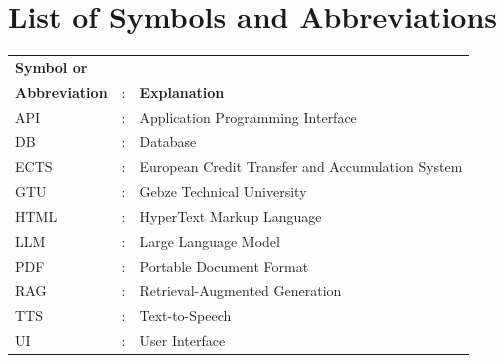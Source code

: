 \chapter*{List of Symbols and Abbreviations}

\begin{tabular}{lcl}
    \textbf{Symbol or}&&\\
    \textbf{Abbreviation} &:& \textbf{Explanation}\\
    
    
    API &:& Application Programming Interface\\
    DB &:& Database\\
    ECTS &:& European Credit Transfer and Accumulation System\\
    GTU &:& Gebze Technical University\\
    HTML &:& HyperText Markup Language\\
    LLM &:& Large Language Model\\
    PDF &:& Portable Document Format\\
    RAG &:& Retrieval-Augmented Generation\\
    TTS &:& Text-to-Speech\\
    UI &:& User Interface\\
    
\end{tabular}

\clearpage
